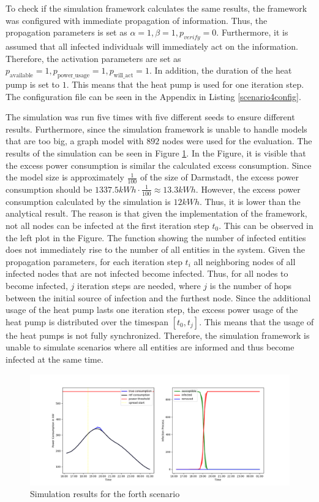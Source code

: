 To check if the simulation framework calculates the same 
results, the framework was configured with immediate
propagation of information. Thus, the propagation
parameters is set as 
$\alpha=1, \beta=1, p_{verify}=0$. 
Furthermore, it is assumed that all infected 
individuals will immediately act on the information.
Therefore, the activation parameters are 
set as $p_{\mathrm{available}}=1, 
p_{\mathrm{power\_usage}}=1, p_{\mathrm{will\_act}}=1$.
In addition, the duration of the heat pump is set to $1$.
This means that the heat pump is used for one iteration step.
The configuration file can be seen in the Appendix in
Listing \ref{scenario4config}.

The simulation was run five times with five 
different seeds to ensure different results. 
Furthermore, since the simulation framework is unable
to handle models that are too big, a graph model with 
$892$ nodes were used for the evaluation. 
The results of the simulation can be seen in 
Figure \ref{warningmessagesimulations}.
In the Figure, it is visible that the excess power 
consumption is similar the calculated excess
consumption. Since the model size is approximately
$\frac{1}{100}$ of the size of Darmstadt, the 
excess power consumption should be
$1337.5 kWh\cdot \frac{1}{100} \approx 13.3 kWh $.
However, the excess power consumption 
calculated by the simulation is $12 kWh$.
Thus, it is lower than the analytical result.
The reason is that given the implementation of the 
framework, not all nodes can be infected at the first
iteration step $t_0$. This can be observed in the 
left plot in the Figure. The function showing the 
number of infected entities does not immediately
rise to the number of all entities in the system.
Given the propagation 
parameters, for each iteration step $t_{i}$ all
neighboring nodes of all infected nodes that
are not infected become infected. Thus, for 
all nodes to become infected, $j$ iteration steps 
are needed, where $j$ is the number of hops between 
the initial source of infection and the furthest 
node. Since the additional usage of the heat pump 
lasts one iteration step, the excess power usage
of the heat pump is distributed over 
the timespan $[t_0, t_j]$. 
This means that the 
usage of the heat pumps is not fully synchronized.
Therefore, the simulation framework is unable
to simulate scenarios where all entities 
are informed and thus become infected at the 
same time. 


\begin{figure}[!ht]
    \center
    \includegraphics[scale=.53]{figs/eval/scenario4/basic_plot.png}
    \caption{Simulation results for the forth scenario}
    \label{warningmessagesimulations}
\end{figure}

